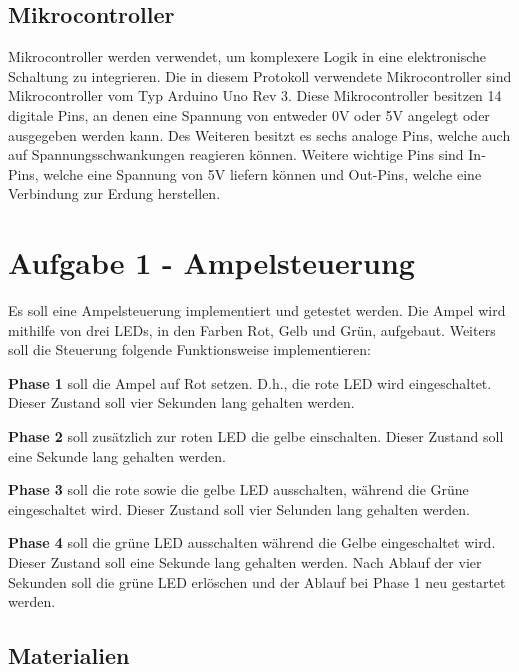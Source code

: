 \documentclass[11pt]{article}
\begin{document}
    \subsection{Mikrocontroller \cite{arduino-r3}}
    \label{subsec:mikrocontroller}

    Mikrocontroller werden verwendet, um komplexere Logik in eine elektronische Schaltung zu integrieren.
    Die in diesem Protokoll verwendete Mikrocontroller sind Mikrocontroller vom Typ Arduino Uno Rev 3.
    Diese Mikrocontroller besitzen 14 digitale Pins, an denen eine Spannung von entweder 0V oder 5V angelegt oder ausgegeben werden kann.
    Des Weiteren besitzt es sechs analoge Pins, welche auch auf Spannungsschwankungen reagieren können.
    Weitere wichtige Pins sind In-Pins, welche eine Spannung von 5V liefern können und Out-Pins, welche eine Verbindung zur Erdung herstellen.

    \section{Aufgabe 1 - Ampelsteuerung}
    \label{sec:aufgabe-1}

    Es soll eine Ampelsteuerung implementiert und getestet werden.
    Die Ampel wird mithilfe von drei LEDs, in den Farben Rot, Gelb und Grün, aufgebaut.
    Weiters soll die Steuerung folgende Funktionsweise implementieren:

    \textbf{Phase 1} soll die Ampel auf Rot setzen.
    D.h., die rote LED wird eingeschaltet.
    Dieser Zustand soll vier Sekunden lang gehalten werden.

    \textbf{Phase 2} soll zusätzlich zur roten LED die gelbe einschalten.
    Dieser Zustand soll eine Sekunde lang gehalten werden.

    \textbf{Phase 3} soll die rote sowie die gelbe LED ausschalten, während die Grüne eingeschaltet wird.
    Dieser Zustand soll vier Selunden lang gehalten werden.

    \textbf{Phase 4} soll die grüne LED ausschalten während die Gelbe eingeschaltet wird.
    Dieser Zustand soll eine Sekunde lang gehalten werden.
    Nach Ablauf der vier Sekunden soll die grüne LED erlöschen und der Ablauf bei Phase 1 neu gestartet werden.

    \subsection{Materialien}
    \label{subsec:A1-materialien}
\end{document}

